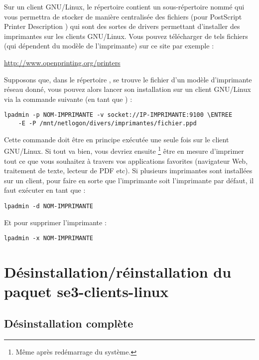 Sur un client GNU/Linux, le répertoire 
contient un sous-répertoire nommé   qui vous permettra
de stocker de manière centralisée des fichiers 
(pour \og PostScript Printer Description \fg) qui sont des sortes
de drivers permettant d'installer
des imprimantes sur les clients GNU/Linux. Vous pouvez télécharger de tels
fichiers (qui dépendent du modèle de l'imprimante) sur ce site par exemple :
%
\begin{center}
\url{http://www.openprinting.org/printers}
\end{center}
%
Supposons que, dans le répertoire ,
se trouve  le fichier  d'un modèle d'imprimante réseau donné,
vous pouvez alors
lancer son installation sur un client GNU/Linux via la commande suivante
(en tant que ) :
%
\begin{lstlisting}[emph={ENTREE},emphstyle={\return}]
lpadmin -p NOM-IMPRIMANTE -v socket://IP-IMPRIMANTE:9100 \ENTREE
    -E -P /mnt/netlogon/divers/imprimantes/fichier.ppd
\end{lstlisting}
%
Cette commande doit être en principe exécutée une seule fois sur le client
GNU/Linux. Si tout va bien, vous devriez ensuite%
%
\footnote{Même après redémarrage du système.}
%
être en mesure d'imprimer
tout ce que vous souhaitez à travers vos applications favorites
(navigateur Web, traitement de texte, lecteur de PDF etc).
Si plusieurs imprimantes sont installées sur un client, 
pour faire en sorte que l'imprimante 
soit l'imprimante par défaut, il faut exécuter en tant que  :
%
\begin{lstlisting}
lpadmin -d NOM-IMPRIMANTE 
\end{lstlisting}
%
Et pour supprimer l'imprimante :
%
\begin{lstlisting}
lpadmin -x NOM-IMPRIMANTE 
\end{lstlisting}






\section{Désinstallation/réinstallation du paquet se3-clients-linux}
\label{desinstallation}


\subsection{Désinstallation complète}

